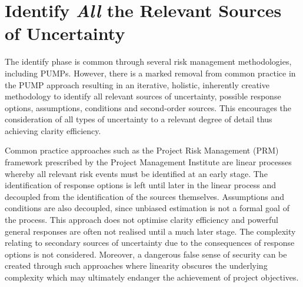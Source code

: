 
\section{Identify \textit{All} the Relevant Sources of Uncertainty} \label{s:Identify}





The identify phase is common through several risk management methodologies, including PUMPs. 
However, there is a marked removal from common practice in the PUMP approach resulting in an iterative, holistic, inherently creative methodology to identify all relevant sources of uncertainty, possible response options, assumptions, conditions and second-order sources.
This encourages the consideration of all types of uncertainty to a relevant degree of detail thus achieving clarity efficiency.

Common practice approaches such as the Project Risk Management (PRM) framework prescribed by the Project Management Institute \citep{pmi2013} are linear processes whereby all relevant risk events must be identified at an early stage. 
The identification of response options is left until later in the linear process and decoupled from the identification of the sources themselves.
Assumptions and conditions are also decoupled, since unbiased estimation is not a formal goal of the process. 
This approach does not optimise clarity efficiency and powerful general responses are often not realised until a much later stage.
The complexity relating to secondary sources of uncertainty due to the consequences of response options is not considered.
Moreover, a dangerous false sense of security can be created through such approaches where linearity obscures the underlying complexity which may ultimately endanger the achievement of project objectives.
                         
